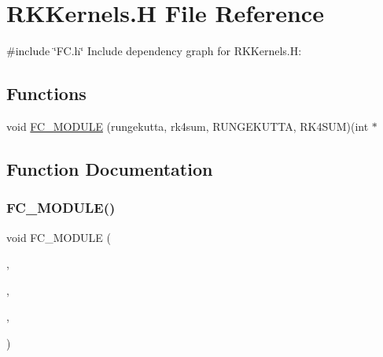 \hypertarget{RKKernels_8H}{}\section{R\+K\+Kernels.\+H File Reference}
\label{RKKernels_8H}
{\ttfamily \#include \char`\"{}F\+C.\+h\char`\"{}}\newline
Include dependency graph for R\+K\+Kernels.\+H\+:
\subsection*{Functions}
\begin{DoxyCompactItemize}
\item 
void \hyperlink{RKKernels_8H_ac7aacb642feb8608777a6c7cbd2522c3}{F\+C\+\_\+\+M\+O\+D\+U\+LE} (rungekutta, rk4sum, R\+U\+N\+G\+E\+K\+U\+T\+TA, R\+K4\+S\+UM)(int $\ast$
\end{DoxyCompactItemize}


\subsection{Function Documentation}
\hypertarget{RKKernels_8H_ac7aacb642feb8608777a6c7cbd2522c3}{}\label{RKKernels_8H_ac7aacb642feb8608777a6c7cbd2522c3} 
\subsubsection{\texorpdfstring{F\+C\+\_\+\+M\+O\+D\+U\+L\+E()}{FC\_MODULE()}}
{\footnotesize\ttfamily void F\+C\+\_\+\+M\+O\+D\+U\+LE (\begin{DoxyParamCaption}\item[{rungekutta}]{,  }\item[{rk4sum}]{,  }\item[{R\+U\+N\+G\+E\+K\+U\+T\+TA}]{,  }\item[{R\+K4\+S\+UM}]{ }\end{DoxyParamCaption})}

